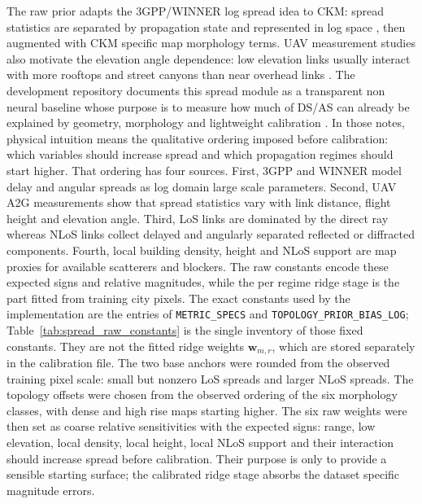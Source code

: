 The raw prior adapts the 3GPP/WINNER log spread idea to CKM: spread statistics
are separated by propagation state and represented in log space
\cite{tr38901,winner2}, then augmented with CKM specific map morphology terms.
UAV measurement studies also motivate the elevation angle dependence: low
elevation links usually interact with more rooftops and street canyons than
near overhead links \cite{cai2019,izydorczyk2019}.
The development repository documents this spread module as a transparent
non neural baseline whose purpose is to measure how much of DS/AS can already
be explained by geometry, morphology and lightweight calibration
\cite{moreno2026tfgprogress}. In those notes, physical intuition means the
qualitative ordering imposed before calibration: which variables should
increase spread and which propagation regimes should start higher. That
ordering has four sources. First, 3GPP and WINNER model delay and angular
spreads as log domain large scale parameters. Second, UAV A2G measurements
show that spread statistics vary with link distance, flight height and
elevation angle. Third, LoS links are dominated by the direct ray whereas NLoS
links collect delayed and angularly separated reflected or diffracted
components. Fourth, local building density, height and NLoS support are map
proxies for available scatterers and blockers. The raw constants encode these
expected signs and relative magnitudes, while the per regime ridge stage is
the part fitted from training city pixels. The exact constants used by the
implementation are the entries of \texttt{METRIC\_SPECS} and
\texttt{TOPOLOGY\_PRIOR\_BIAS\_LOG}; Table~\ref{tab:spread_raw_constants}
is the single inventory of those fixed constants. They are not the fitted ridge
weights \(\textbf{w}_{m,r}\), which are stored separately in the calibration file.
The two base anchors were rounded from the observed training pixel scale:
small but nonzero LoS spreads and larger NLoS spreads. The topology offsets
were chosen from the observed ordering of the six morphology classes, with
dense and high rise maps starting higher. The six raw weights were then set as
coarse relative sensitivities with the expected signs: range, low elevation,
local density, local height, local NLoS support and their interaction should
increase spread before calibration. Their purpose is only to provide a sensible
starting surface; the calibrated ridge stage absorbs the dataset specific
magnitude errors.

